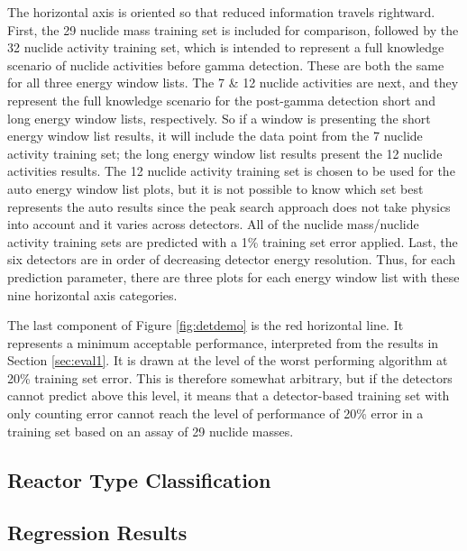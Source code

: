 The horizontal axis is oriented so that reduced information travels rightward.
First, the 29 nuclide mass training set is included for comparison, followed by
the 32 nuclide activity training set, which is intended to represent a full
knowledge scenario of nuclide activities before gamma detection. These are both
the same for all three energy window lists.  The 7 \& 12 nuclide activities are
next, and they represent the full knowledge scenario for the post-gamma
detection short and long energy window lists, respectively.  So if a window is
presenting the short energy window list results, it will include the data point
from the 7 nuclide activity training set; the long energy window list results
present the 12 nuclide activities results. The 12
nuclide activity training set is chosen to be used for the auto energy window
list plots, but it is not possible to know which set best represents the auto
results since the peak search approach does not take physics into account and
it varies across detectors. All of the nuclide mass/nuclide activity training
sets are predicted with a 1\% training set error applied.  Last, the six
detectors are in order of decreasing detector energy resolution. Thus, for each
prediction parameter, there are three plots for each energy window list with
these nine horizontal axis categories. 

The last component of Figure \ref{fig:detdemo} is the red horizontal line.  It
represents a minimum acceptable performance, interpreted from the results in
Section \ref{sec:eval1}. It is drawn at the level of the worst performing
algorithm at 20\% training set error.  This is therefore somewhat arbitrary,
but if the detectors cannot predict above this level, it means that a
detector-based training set with only counting error cannot reach the level of
performance of 20\% error in a training set based on an assay of 29 nuclide
masses.

\subsection{Reactor Type Classification}

\label{sec:exp2_rxtr}

\subsection{Regression Results}

\label{sec:exp2_reg}
